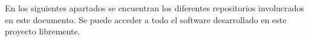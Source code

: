 
En los siguientes apartados se encuentran los diferentes repositorios involucrados en este documento. Se puede acceder a todo el software desarrollado en este proyecto libremente.
